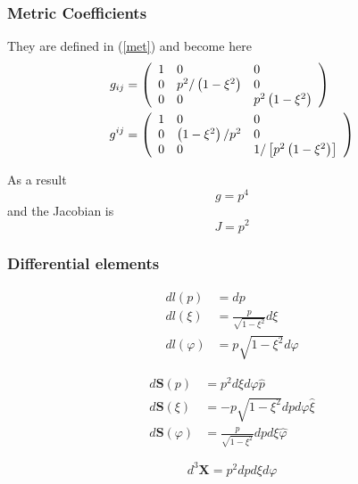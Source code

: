 \subsubsection{Metric Coefficients}

They are defined in (\ref{met}) and become here 
\begin{align}
g_{ij} & =\left( 
\begin{array}{lll}
1 & 0 & 0 \\ 
0 & p^{2}/\left( 1-\xi^{2}\right) & 0 \\ 
0 & 0 & p^{2}\left( 1-\xi^{2}\right)%
\end{array}
\right) \\
g^{ij} & =\left( 
\begin{array}{lll}
1 & 0 & 0 \\ 
0 & \left( 1-\xi^{2}\right) /p^{2} & 0 \\ 
0 & 0 & 1/\left[ p^{2}\left( 1-\xi^{2}\right) \right]%
\end{array}
\right)  \notag
\end{align}

As a result 
\begin{equation}
g=p^{4}
\end{equation}
and the Jacobian is 
\begin{equation}
J=p^{2}  \label{jacpxi}
\end{equation}

\subsubsection{Differential elements}

\begin{align}
dl\left( p\right) & =dp \\
dl\left( \xi\right) & =\frac{p}{\sqrt{1-\xi^{2}}}d\xi \\
dl\left( \varphi\right) & =p\sqrt{1-\xi^{2}}d\varphi  \label{dlphipxi}
\end{align}

\begin{align}
d\mathbf{S}\left( p\right) & =p^{2}d\xi d\varphi\widehat{p} \\
d\mathbf{S}\left( \xi\right) & =-p\sqrt{1-\xi^{2}}dpd\varphi\widehat{\xi } \\
d\mathbf{S}\left( \varphi\right) & =\frac{p}{\sqrt{1-\xi^{2}}}dpd\xi\widehat{
\varphi}
\end{align}

\begin{equation}
d^{3}\mathbf{X}=p^{2}dpd\xi d\varphi
\end{equation}

